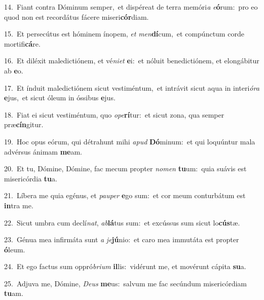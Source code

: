 {\numbfont\textcolor{\numbcolor}{14.}}~Fiant contra Dóminum semper,~\dagger et dispéreat de terra memóri\textit{a} \textit{e}\-\textbf{ó}rum:~\star pro eo quod non est recordátus fácere miseri\-\textbf{cór}\-diam.\par
{\numbfont\textcolor{\numbcolor}{15.}}~Et persecútus est hóminem ínopem, \textit{et} \textit{men}\-\textbf{dí}cum,~\star et compúnctum corde mortifi\-\textbf{cá}\-re.\par
{\numbfont\textcolor{\numbcolor}{16.}}~Et diléxit maledictiónem, et vé\-\textit{ni}\-\textit{et} \textbf{e}\-i:~\star et nóluit benedictiónem, et elongábitur ab \textbf{e}\-o.\par
{\numbfont\textcolor{\numbcolor}{17.}}~Et índuit maledictiónem sicut vestiméntum,~\dagger et intrávit sicut aqua in interi\-\textit{ó}\-\textit{ra} \textbf{e}\-jus,~\star et sicut óleum in óssibus \textbf{e}\-jus.\par
{\numbfont\textcolor{\numbcolor}{18.}}~Fiat ei sicut vestiméntum, quo \textit{o}\-\textit{pe}\textbf{rí}tur:~\star et sicut zona, qua semper præ\-\textbf{cín}\-gitur.\par
{\numbfont\textcolor{\numbcolor}{19.}}~Hoc opus eórum, qui détrahunt mihi \textit{a}\-\textit{pud} \textbf{Dó}\-minum:~\star et qui loquúntur mala advérsus ánimam \textbf{me}\-am.\par
{\numbfont\textcolor{\numbcolor}{20.}}~Et tu, Dómine, Dómine, fac mecum propter \textit{no}\-\textit{men} \textbf{tu}\-um:~\star quia suávis est misericórdia \textbf{tu}\-a.\par
{\numbfont\textcolor{\numbcolor}{21.}}~Líbera me quia egénus, et \textit{pau}\-\textit{per} \textbf{e}\-go sum:~\star et cor meum conturbátum est \textbf{in}\-tra me.\par
{\numbfont\textcolor{\numbcolor}{22.}}~Sicut umbra cum declí\-\textit{nat}\-, \textit{ab}\-\textbf{lá}tus sum:~\star et excússus sum sicut lo\-\textbf{cús}\-tæ.\par
{\numbfont\textcolor{\numbcolor}{23.}}~Génua mea infirmáta sunt \textit{a} \textit{je}\-\textbf{jú}nio:~\star et caro mea immutáta est propter \textbf{ó}\-leum.\par
{\numbfont\textcolor{\numbcolor}{24.}}~Et ego factus sum oppró\-\textit{bri}\-\textit{um} \textbf{il}\-lis:~\star vidérunt me, et movérunt cápita \textbf{su}\-a.\par
{\numbfont\textcolor{\numbcolor}{25.}}~Adjuva me, Dómine, \textit{De}\-\textit{us} \textbf{me}\-us:~\star salvum me fac secúndum misericórdiam \textbf{tu}\-am.\par
